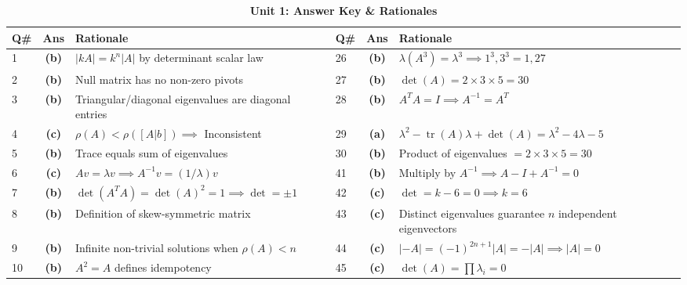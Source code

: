 \begin{table}[htbp]
\centering
\caption{\textbf{Unit 1: Answer Key \& Rationales}}
\vspace{2mm}
\begin{tabularx}{\textwidth}{l c X l c X}
\toprule
\textbf{Q\#} & \textbf{Ans} & \textbf{Rationale} & \textbf{Q\#} & \textbf{Ans} & \textbf{Rationale} \\
\midrule
1 & \textbf{(b)} & $|kA| = k^n|A|$ by determinant scalar law & 26 & \textbf{(b)} & $\lambda(A^3) = \lambda^3 \implies 1^3, 3^3 = 1, 27$ \\
2 & \textbf{(b)} & Null matrix has no non-zero pivots & 27 & \textbf{(b)} & $\det(A) = 2 \times 3 \times 5 = 30$ \\
3 & \textbf{(b)} & Triangular/diagonal eigenvalues are diagonal entries & 28 & \textbf{(b)} & $A^T A = I \implies A^{-1} = A^T$ \\
4 & \textbf{(c)} & $\rho(A) < \rho([A|b]) \implies$ Inconsistent & 29 & \textbf{(a)} & $\lambda^2 - \operatorname{tr}(A)\lambda + \det(A) = \lambda^2 - 4\lambda - 5$ \\
5 & \textbf{(b)} & Trace equals sum of eigenvalues & 30 & \textbf{(b)} & Product of eigenvalues $= 2 \times 3 \times 5 = 30$ \\
6 & \textbf{(c)} & $A v = \lambda v \implies A^{-1} v = (1/\lambda)v$ & 41 & \textbf{(b)} & Multiply by $A^{-1} \implies A - I + A^{-1} = 0$ \\
7 & \textbf{(b)} & $\det(A^T A) = \det(A)^2 = 1 \implies \det = \pm 1$ & 42 & \textbf{(c)} & $\det = k - 6 = 0 \implies k = 6$ \\
8 & \textbf{(b)} & Definition of skew-symmetric matrix & 43 & \textbf{(c)} & Distinct eigenvalues guarantee $n$ independent eigenvectors \\
9 & \textbf{(b)} & Infinite non-trivial solutions when $\rho(A) < n$ & 44 & \textbf{(c)} & $|-A| = (-1)^{2n+1}|A| = -|A| \implies |A|=0$ \\
10 & \textbf{(b)} & $A^2 = A$ defines idempotency & 45 & \textbf{(c)} & $\det(A) = \prod \lambda_i = 0$ \\
\bottomrule
\end{tabularx}
\end{table}
